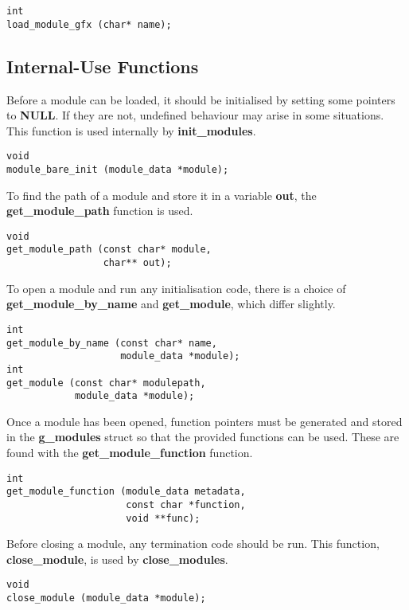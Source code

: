 \documentclass[12pt,a4paper]{article}
\begin{document}
\begin{lstlisting}
int
load_module_gfx (char* name);
\end{lstlisting}

\subsection{Internal-Use Functions}

Before a module can be loaded, it should be initialised by setting some pointers to \textbf{NULL}. If they are not, undefined behaviour may arise in some situations. This function is used internally by \textbf{init\_modules}.

\begin{lstlisting}
void
module_bare_init (module_data *module);
\end{lstlisting}

To find the path of a module and store it in a variable \textbf{out}, the \textbf{get\_module\_path} function is used.

\begin{lstlisting}
void
get_module_path (const char* module,
                 char** out);
\end{lstlisting}

To open a module and run any initialisation code, there is a choice of \textbf{get\_module\_by\_name} and \textbf{get\_module}, which differ slightly.

\begin{lstlisting}
int
get_module_by_name (const char* name,
                    module_data *module);
int
get_module (const char* modulepath,
            module_data *module);
\end{lstlisting}

Once a module has been opened, function pointers must be generated and stored in the \textbf{g\_modules} struct so that the provided functions can be used. These are found with the \textbf{get\_module\_function} function.

\begin{lstlisting}
int
get_module_function (module_data metadata,
                     const char *function,
                     void **func);
\end{lstlisting}

Before closing a module, any termination code should be run. This function, \textbf{close\_module}, is used by \textbf{close\_modules}.

\begin{lstlisting}
void
close_module (module_data *module);
\end{lstlisting}
\end{document}
